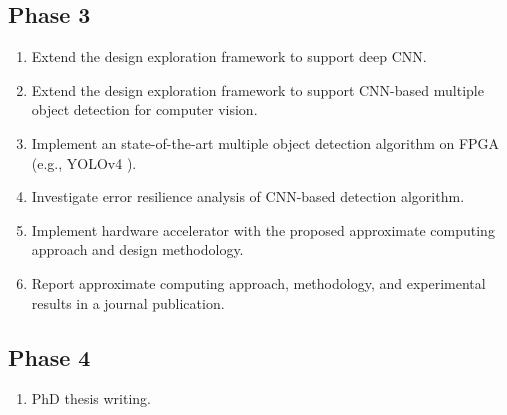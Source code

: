 \subsection{Phase 3}
\begin{enumerate}
	\item Extend the design exploration framework to support deep CNN.
	\item Extend the design exploration framework to support CNN-based multiple object detection for computer vision.
	\item Implement an state-of-the-art multiple object detection algorithm on FPGA (e.g., YOLOv4 \cite{bochkovskiy2020yolov4}).
	\item Investigate error resilience analysis of CNN-based detection algorithm.
	\item Implement hardware accelerator with the proposed approximate computing approach and design methodology.
	\item Report approximate computing approach, methodology, and experimental results in a journal publication.
\end{enumerate}

\subsection{Phase 4}
\begin{enumerate}
\item PhD thesis writing.
\end{enumerate}
	
